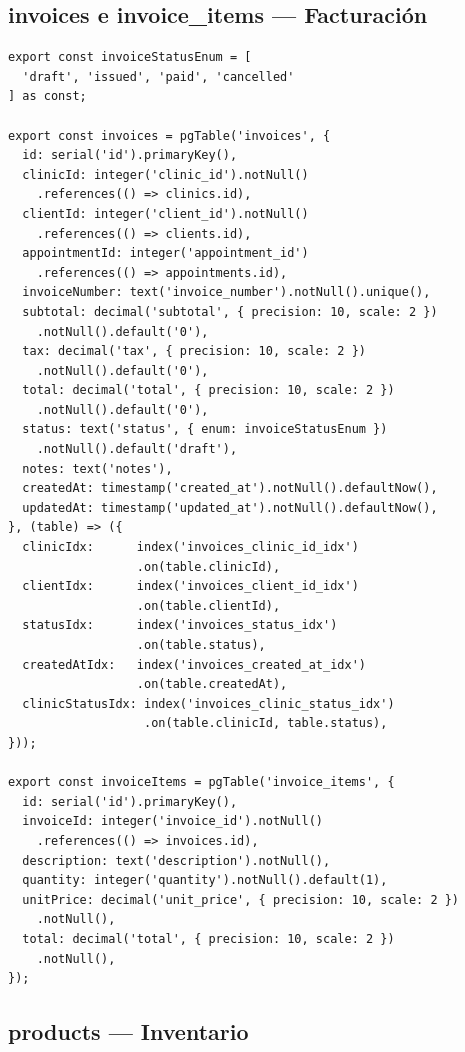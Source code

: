 \subsection{invoices e invoice\_items --- Facturaci\'on}

\begin{lstlisting}[style=typescript, caption=Esquemas de facturacion]
export const invoiceStatusEnum = [
  'draft', 'issued', 'paid', 'cancelled'
] as const;

export const invoices = pgTable('invoices', {
  id: serial('id').primaryKey(),
  clinicId: integer('clinic_id').notNull()
    .references(() => clinics.id),
  clientId: integer('client_id').notNull()
    .references(() => clients.id),
  appointmentId: integer('appointment_id')
    .references(() => appointments.id),
  invoiceNumber: text('invoice_number').notNull().unique(),
  subtotal: decimal('subtotal', { precision: 10, scale: 2 })
    .notNull().default('0'),
  tax: decimal('tax', { precision: 10, scale: 2 })
    .notNull().default('0'),
  total: decimal('total', { precision: 10, scale: 2 })
    .notNull().default('0'),
  status: text('status', { enum: invoiceStatusEnum })
    .notNull().default('draft'),
  notes: text('notes'),
  createdAt: timestamp('created_at').notNull().defaultNow(),
  updatedAt: timestamp('updated_at').notNull().defaultNow(),
}, (table) => ({
  clinicIdx:      index('invoices_clinic_id_idx')
                  .on(table.clinicId),
  clientIdx:      index('invoices_client_id_idx')
                  .on(table.clientId),
  statusIdx:      index('invoices_status_idx')
                  .on(table.status),
  createdAtIdx:   index('invoices_created_at_idx')
                  .on(table.createdAt),
  clinicStatusIdx: index('invoices_clinic_status_idx')
                   .on(table.clinicId, table.status),
}));

export const invoiceItems = pgTable('invoice_items', {
  id: serial('id').primaryKey(),
  invoiceId: integer('invoice_id').notNull()
    .references(() => invoices.id),
  description: text('description').notNull(),
  quantity: integer('quantity').notNull().default(1),
  unitPrice: decimal('unit_price', { precision: 10, scale: 2 })
    .notNull(),
  total: decimal('total', { precision: 10, scale: 2 })
    .notNull(),
});
\end{lstlisting}

\subsection{products --- Inventario}

